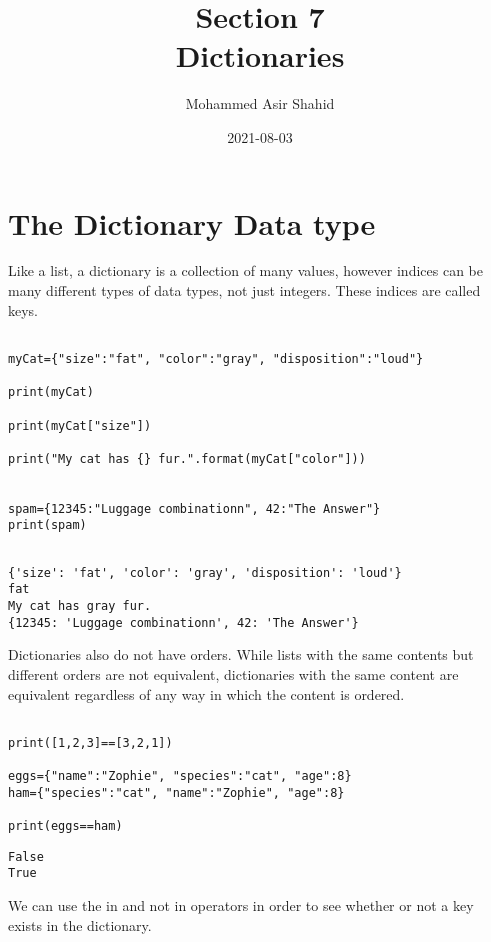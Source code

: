\documentclass[11pt]{article}
\author{Mohammed Asir Shahid}
\date{2021-08-03}
\title{Section 7\\\medskip
\large Dictionaries}
\begin{document}
\maketitle
\tableofcontents


\section{The Dictionary Data type}
\label{sec:orge7a77d4}

Like a list, a dictionary is a collection of many values, however indices can be many different types of data types, not just integers. These indices are called keys.

\begin{verbatim}

myCat={"size":"fat", "color":"gray", "disposition":"loud"}

print(myCat)

print(myCat["size"])

print("My cat has {} fur.".format(myCat["color"]))


spam={12345:"Luggage combinationn", 42:"The Answer"}
print(spam)


\end{verbatim}

\begin{verbatim}
{'size': 'fat', 'color': 'gray', 'disposition': 'loud'}
fat
My cat has gray fur.
{12345: 'Luggage combinationn', 42: 'The Answer'}
\end{verbatim}


Dictionaries also do not have orders. While lists with the same contents but different orders are not equivalent, dictionaries with the same content are equivalent regardless of any way in which the content is ordered.


\begin{verbatim}

print([1,2,3]==[3,2,1])

eggs={"name":"Zophie", "species":"cat", "age":8}
ham={"species":"cat", "name":"Zophie", "age":8}

print(eggs==ham)

\end{verbatim}

\begin{verbatim}
False
True
\end{verbatim}


We can use the in and not in operators in order to see whether or not a key exists in the dictionary.
\end{document}
